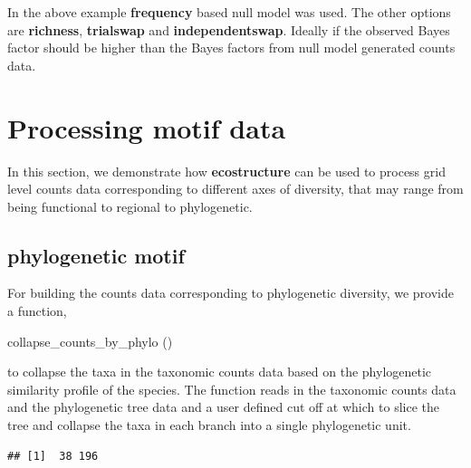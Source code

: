 \documentclass[12pt]{article}
\begin{document}
In the above example \textbf{frequency} based null model was used. The other options are \textbf{richness}, \textbf{trialswap} and \textbf{independentswap}. Ideally if the observed Bayes factor should be higher than the Bayes factors from null model generated counts data.


\section{Processing motif data}

In this section, we demonstrate how \textbf{ecostructure} can be used to process
grid level counts data corresponding to different axes of diversity, that may range from being functional to regional to phylogenetic.

\subsection{phylogenetic motif}

For building the counts data corresponding to phylogenetic diversity, we provide a function,
\begin{verb} collapse_counts_by_phylo () \end{verb} to collapse the taxa in the taxonomic counts data based on the phylogenetic similarity profile of the species.
The function reads in the taxonomic counts data and the phylogenetic tree data and a user defined cut off at which to slice the tree and collapse the taxa in each branch into a single phylogenetic unit.

\begin{knitrout}
\color{fgcolor}\begin{kframe}
\begin{alltt}
 \hlkwb{<-} \hlopt{::}\hlstd{(}\hlstd{(}\hlstd{,}
                                   \hlstd{,}
                                     \hlstd{=} \hlstd{))}
 \hlkwb{<-} 
                                           \hlstd{=} \hlstd{)}
\end{alltt}
\begin{verbatim}
## [1]  38 196
\end{verbatim}
\end{kframe}
\end{knitrout}
\end{document}
